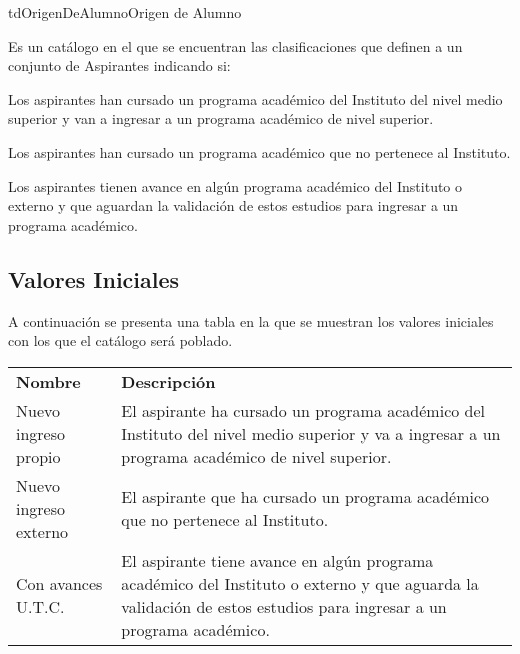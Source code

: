 \begin{TipoDeDato}{tdOrigenDeAlumno}{Origen de Alumno}{Es un catálogo en el que se encuentran las clasificaciones que definen a un conjunto de Aspirantes indicando si:
	\begin{Citemize}
		\item Los aspirantes han cursado un programa académico del Instituto del nivel medio superior  y van a ingresar a un programa académico de nivel superior.
		\item Los aspirantes han cursado un programa académico que no pertenece al Instituto.
		\item Los aspirantes tienen avance en algún programa académico del Instituto o externo y que aguardan la validación de estos estudios para ingresar a un programa académico.
	\end{Citemize}}
	
	\begin{tdAtributos}
		
	
	\end{tdAtributos}
	
	\subsection{Valores Iniciales}

	 A continuación se presenta una tabla en la que se muestran los valores iniciales con los que el catálogo será poblado. \cdtEmpty
		\begin{longtable}{|p{}|p{}|}
				\hline
				\rowcolor{colorPrincipal}
	 			\multicolumn{2}{c}{\bf \color{white} Valores Iniciales}\\
	 			\hline
	 			\rowcolor{colorSecundario}
	 			\bf\color{white}Nombre & \bf\color{white}Descripción\\
	 			\hline
	 			Nuevo ingreso propio &  El aspirante ha cursado un programa académico del Instituto del nivel medio superior y va a ingresar a un programa académico de nivel superior. \\
	 			\hline
	 			Nuevo ingreso externo &  El aspirante que ha cursado un programa académico que no pertenece al Instituto.\\
	 			\hline
	 			Con avances U.T.C. & El aspirante tiene avance en algún programa académico del Instituto o externo y que aguarda la validación de estos estudios para ingresar a un programa académico.\\
	 			\hline
		\end{longtable}
\end{TipoDeDato}


